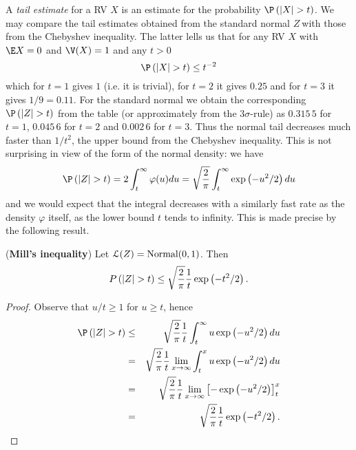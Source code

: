 A \textit{tail estimate} for a RV $X$ is an estimate for the probability $%
\P \left( \left\vert X\right\vert >t\right) $. We may compare the tail
estimates obtained from the standard normal $Z\ $with those from the
Chebyshev inequality. The latter lells us that for any RV $X$ with $\E X=0$
and $\V(X)=1$ and any $t>0$ 
\begin{equation*}
\P \left( \left\vert X\right\vert >t\right) \leq t^{-2}
\end{equation*}%
which for $t=1$ gives $1$ (i.e. it is trivial), for $t=2$ it gives $0.25$
and for $t=3$ it gives $1/9=0.11$. For the standard normal we obtain the
corresponding $\P \left( \left\vert Z\right\vert >t\right) $ from the table
(or approximately from the $3\sigma $-rule) as $0.315\,5$ for $t=1$, $%
0.045\,6$ for $t=2$ and $0.002\,6$ for $t=3$. Thus the normal tail decreases
much faster than $1/t^{2}$, the upper bound from the Chebyshev inequality.
This is not surprising in view of the form of the normal density: we have 
\begin{equation*}
\P \left( \left\vert Z\right\vert >t\right) =2\int_{t}^{\infty }\varphi
(u)du=\sqrt{\frac{2}{\pi }}\int_{t}^{\infty }\exp \left( -u^{2}/2\right) du
\end{equation*}%
and we would expect that the integral decreases with a similarly fast rate
as the density $\varphi $ itself, as the lower bound $t$ tends to infinity.
This is made precise by the following result.

\begin{prop}
(\textbf{Mill's inequality}) Let $\mathcal{L}(Z)=\mbox{{\rm Normal}}(0,1)$. Then 
\begin{equation}
P\left( \left\vert Z\right\vert >t\right) \leq \sqrt{\frac{2}{\pi }}\frac{1}{%
t}\exp \left( -t^{2}/2\right) .  \label{mills-ineq}
\end{equation}
\end{prop}

\begin{proof}
Observe that $u/t\geq 1$ for $u\geq t$, hence 
\begin{eqnarray*}
\P \left( \left\vert Z\right\vert >t\right) &\leq &\sqrt{\frac{2}{\pi }}%
\frac{1}{t}\int_{t}^{\infty }u\exp \left( -u^{2}/2\right) du \\
&=&\sqrt{\frac{2}{\pi }}\frac{1}{t}\lim_{x\rightarrow \infty
}\int_{t}^{x}u\exp \left( -u^{2}/2\right) du \\
&=&\sqrt{\frac{2}{\pi }}\frac{1}{t}\lim_{x\rightarrow \infty }\left[ -\exp
\left( -u^{2}/2\right) \right] _{t}^{x} \\
&=&\sqrt{\frac{2}{\pi }}\frac{1}{t}\exp \left( -t^{2}/2\right) .
\end{eqnarray*}
\end{proof}



